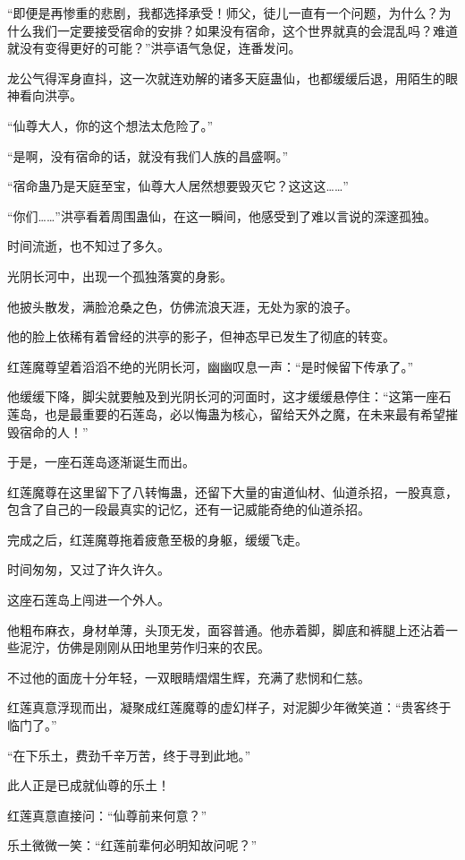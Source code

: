 \begin{this_body}
“即便是再惨重的悲剧，我都选择承受！师父，徒儿一直有一个问题，为什么？为什么我们一定要接受宿命的安排？如果没有宿命，这个世界就真的会混乱吗？难道就没有变得更好的可能？”洪亭语气急促，连番发问。

龙公气得浑身直抖，这一次就连劝解的诸多天庭蛊仙，也都缓缓后退，用陌生的眼神看向洪亭。

“仙尊大人，你的这个想法太危险了。”

“是啊，没有宿命的话，就没有我们人族的昌盛啊。”

“宿命蛊乃是天庭至宝，仙尊大人居然想要毁灭它？这这这……”

“你们……”洪亭看着周围蛊仙，在这一瞬间，他感受到了难以言说的深邃孤独。

时间流逝，也不知过了多久。

光阴长河中，出现一个孤独落寞的身影。

他披头散发，满脸沧桑之色，仿佛流浪天涯，无处为家的浪子。

他的脸上依稀有着曾经的洪亭的影子，但神态早已发生了彻底的转变。

红莲魔尊望着滔滔不绝的光阴长河，幽幽叹息一声：“是时候留下传承了。”

他缓缓下降，脚尖就要触及到光阴长河的河面时，这才缓缓悬停住：“这第一座石莲岛，也是最重要的石莲岛，必以悔蛊为核心，留给天外之魔，在未来最有希望摧毁宿命的人！”

于是，一座石莲岛逐渐诞生而出。

红莲魔尊在这里留下了八转悔蛊，还留下大量的宙道仙材、仙道杀招，一股真意，包含了自己的一段最真实的记忆，还有一记威能奇绝的仙道杀招。

完成之后，红莲魔尊拖着疲惫至极的身躯，缓缓飞走。

时间匆匆，又过了许久许久。

这座石莲岛上闯进一个外人。

他粗布麻衣，身材单薄，头顶无发，面容普通。他赤着脚，脚底和裤腿上还沾着一些泥泞，仿佛是刚刚从田地里劳作归来的农民。

不过他的面庞十分年轻，一双眼睛熠熠生辉，充满了悲悯和仁慈。

红莲真意浮现而出，凝聚成红莲魔尊的虚幻样子，对泥脚少年微笑道：“贵客终于临门了。”

“在下乐土，费劲千辛万苦，终于寻到此地。”

此人正是已成就仙尊的乐土！

红莲真意直接问：“仙尊前来何意？”

乐土微微一笑：“红莲前辈何必明知故问呢？”


\end{this_body}
